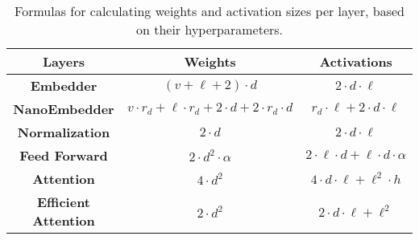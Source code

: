\begin{table*}[htbp]
    \caption{Formulas for calculating weights and activation sizes per layer, based on their hyperparameters.}
    \begin{center}
    
        \begin{tabular}{|c | c c|}
        \hline

        \textbf{Layers} & \textbf{Weights} & \textbf{Activations} \\
        \hline \hline
        \textbf{Embedder}               & $(v + \ell +2)\cdot d$ 
                                        & $2\cdot d\cdot \ell$ \\
        \textbf{NanoEmbedder}           & \(v \cdot r_d + \ell \cdot r_d + 2 \cdot d + 2 \cdot r_d \cdot d\) 
                                        & \(r_d \cdot \ell + 2 \cdot d \cdot \ell\) \\
        \textbf{Normalization}          & \(2 \cdot d\)
                                        & \(2 \cdot d \cdot \ell\) \\
        \textbf{Feed Forward}           & \(2 \cdot d^2 \cdot \alpha \) 
                                        & \(2 \cdot \ell \cdot d + \ell \cdot d \cdot \alpha\)\\
        \textbf{Attention}              & \(4 \cdot d^2 \)
                                        & \(4 \cdot d \cdot \ell + \ell^2 \cdot h\)\\
        \textbf{Efficient Attention}    & \(2 \cdot d^2 \) 
                                        & \(2 \cdot d \cdot \ell + \ell^2 \)\\
        \hline
        \end{tabular}
    
    \end{center}
    \label{table:memory_analysis}
\end{table*}




